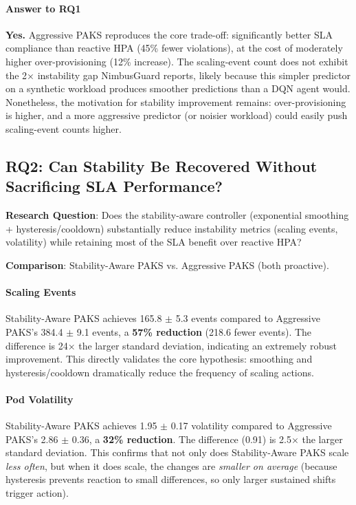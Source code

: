 \paragraph{Answer to RQ1} \textbf{Yes.} Aggressive PAKS reproduces the core trade-off: significantly better SLA compliance than reactive HPA (45\% fewer violations), at the cost of moderately higher over-provisioning (12\% increase). The scaling-event count does not exhibit the 2× instability gap NimbusGuard reports, likely because this simpler predictor on a synthetic workload produces smoother predictions than a DQN agent would. Nonetheless, the motivation for stability improvement remains: over-provisioning is higher, and a more aggressive predictor (or noisier workload) could easily push scaling-event counts higher.

\subsection{RQ2: Can Stability Be Recovered Without Sacrificing SLA Performance?}
\label{sec:evalTwo}

\textbf{Research Question}: Does the stability-aware controller (exponential smoothing + hysteresis/cooldown) substantially reduce instability metrics (scaling events, volatility) while retaining most of the SLA benefit over reactive HPA?

\textbf{Comparison}: Stability-Aware PAKS vs. Aggressive PAKS (both proactive).

\paragraph{Scaling Events} Stability-Aware PAKS achieves 165.8 $\pm$ 5.3 events compared to Aggressive PAKS's 384.4 $\pm$ 9.1 events, a \textbf{57\% reduction} (218.6 fewer events). The difference is 24× the larger standard deviation, indicating an extremely robust improvement. This directly validates the core hypothesis: smoothing and hysteresis/cooldown dramatically reduce the frequency of scaling actions.



\paragraph{Pod Volatility} Stability-Aware PAKS achieves 1.95 $\pm$ 0.17 volatility compared to Aggressive PAKS's 2.86 $\pm$ 0.36, a \textbf{32\% reduction}. The difference (0.91) is 2.5× the larger standard deviation. This confirms that not only does Stability-Aware PAKS scale \emph{less often}, but when it does scale, the changes are \emph{smaller on average} (because hysteresis prevents reaction to small differences, so only larger sustained shifts trigger action).

